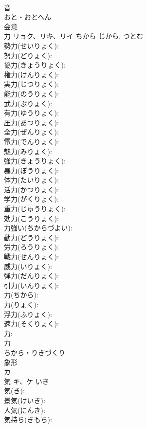 \documentclass[8pt]{extreport}
\begin{document}
\begin{CJK}{UTF8}{min}
\\	音	
\\	おと・おとへん	
\\	会意 
\\	力	リョク、リキ、リイ	ちから	じから, つとむ	
\\	勢力(せいりょく): 
\\	努力(どりょく): 
\\	協力(きょうりょく): 
\\	権力(けんりょく): 
\\	実力(じつりょく): 
\\	能力(のうりょく): 
\\	武力(ぶりょく): 
\\	有力(ゆうりょく): 
\\	圧力(あつりょく): 
\\	全力(ぜんりょく): 
\\	電力(でんりょく): 
\\	魅力(みりょく): 
\\	強力(きょうりょく): 
\\	暴力(ぼうりょく): 
\\	体力(たいりょく): 
\\	活力(かつりょく): 
\\	学力(がくりょく): 
\\	重力(じゅうりょく): 
\\	効力(こうりょく): 
\\	力強い(ちからづよい): 
\\	動力(どうりょく): 
\\	労力(ろうりょく): 
\\	戦力(せんりょく): 
\\	威力(いりょく): 
\\	弾力(だんりょく): 
\\	引力(いんりょく): 
\\	力(ちから): 
\\	力(りょく): 
\\	浮力(ふりょく): 
\\	速力(そくりょく): 
\\	力: 
\\	力	
\\	ちから・りきづくり	
\\	象形 
\\	カ 
\\	気	キ、ケ	いき		
\\	気(き): 
\\	景気(けいき): 
\\	人気(にんき): 
\\	気持ち(きもち): 

\end{CJK}
\end{document}
